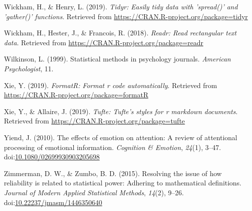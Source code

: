 \documentclass[english,,man,floatsintext]{apa6}
\begin{document}
\leavevmode\hypertarget{ref-R-tidyr}{}%
Wickham, H., \& Henry, L. (2019). \emph{Tidyr: Easily tidy data with 'spread()' and 'gather()' functions}. Retrieved from \url{https://CRAN.R-project.org/package=tidyr}

\leavevmode\hypertarget{ref-R-readr}{}%
Wickham, H., Hester, J., \& Francois, R. (2018). \emph{Readr: Read rectangular text data}. Retrieved from \url{https://CRAN.R-project.org/package=readr}

\leavevmode\hypertarget{ref-wilkinson_statistical_1999}{}%
Wilkinson, L. (1999). Statistical methods in psychology journals. \emph{American Psychologist}, 11.

\leavevmode\hypertarget{ref-R-formatR}{}%
Xie, Y. (2019). \emph{FormatR: Format r code automatically}. Retrieved from \url{https://CRAN.R-project.org/package=formatR}

\leavevmode\hypertarget{ref-R-tufte}{}%
Xie, Y., \& Allaire, J. (2019). \emph{Tufte: Tufte's styles for r markdown documents}. Retrieved from \url{https://CRAN.R-project.org/package=tufte}

\leavevmode\hypertarget{ref-yiend_effects_2010}{}%
Yiend, J. (2010). The effects of emotion on attention: A review of attentional processing of emotional information. \emph{Cognition \& Emotion}, \emph{24}(1), 3--47. doi:\href{https://doi.org/10.1080/02699930903205698}{10.1080/02699930903205698}

\leavevmode\hypertarget{ref-zimmerman_resolving_2015}{}%
Zimmerman, D. W., \& Zumbo, B. D. (2015). Resolving the issue of how reliability is related to statistical power: Adhering to mathematical definitions. \emph{Journal of Modern Applied Statistical Methods}, \emph{14}(2), 9--26. doi:\href{https://doi.org/10.22237/jmasm/1446350640}{10.22237/jmasm/1446350640}
\end{document}
